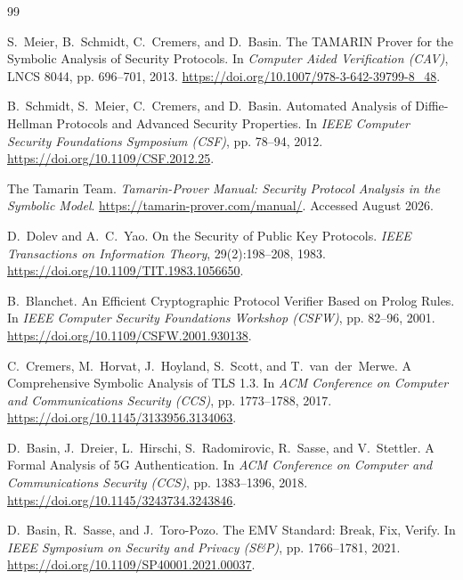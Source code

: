 \documentclass[version=preprint]{iacrcc}
\theoremstyle{definition}
\theoremstyle{remark}
\begin{document}
\begin{thebibliography}{99}

	S.~Meier, B.~Schmidt, C.~Cremers, and D.~Basin.
	\newblock The TAMARIN Prover for the Symbolic Analysis of Security Protocols.
	\newblock In \emph{Computer Aided Verification (CAV)}, LNCS 8044, pp. 696--701,
	2013.
	\newblock \url{https://doi.org/10.1007/978-3-642-39799-8_48}.

	B.~Schmidt, S.~Meier, C.~Cremers, and D.~Basin.
	\newblock Automated Analysis of Diffie-Hellman Protocols and Advanced Security
	Properties.
	\newblock In \emph{IEEE Computer Security Foundations Symposium (CSF)},
	pp. 78--94, 2012.
	\newblock \url{https://doi.org/10.1109/CSF.2012.25}.

	The Tamarin Team.
	\newblock \emph{Tamarin-Prover Manual: Security Protocol Analysis in the
		Symbolic Model}.
	\newblock \url{https://tamarin-prover.com/manual/}. Accessed August 2026.

	D.~Dolev and A.~C.~Yao.
	\newblock On the Security of Public Key Protocols.
	\newblock \emph{IEEE Transactions on Information Theory}, 29(2):198--208, 1983.
	\newblock \url{https://doi.org/10.1109/TIT.1983.1056650}.

	B.~Blanchet.
	\newblock An Efficient Cryptographic Protocol Verifier Based on Prolog Rules.
	\newblock In \emph{IEEE Computer Security Foundations Workshop (CSFW)},
	pp. 82--96, 2001.
	\newblock \url{https://doi.org/10.1109/CSFW.2001.930138}.

	C.~Cremers, M.~Horvat, J.~Hoyland, S.~Scott, and T.~van~der~Merwe.
	\newblock A Comprehensive Symbolic Analysis of TLS 1.3.
	\newblock In \emph{ACM Conference on Computer and Communications Security
		(CCS)}, pp. 1773--1788, 2017.
	\newblock \url{https://doi.org/10.1145/3133956.3134063}.

	D.~Basin, J.~Dreier, L.~Hirschi, S.~Radomirovic, R.~Sasse, and V.~Stettler.
	\newblock A Formal Analysis of 5G Authentication.
	\newblock In \emph{ACM Conference on Computer and Communications Security
		(CCS)}, pp. 1383--1396, 2018.
	\newblock \url{https://doi.org/10.1145/3243734.3243846}.

	D.~Basin, R.~Sasse, and J.~Toro-Pozo.
	\newblock The EMV Standard: Break, Fix, Verify.
	\newblock In \emph{IEEE Symposium on Security and Privacy (S\&P)},
	pp. 1766--1781, 2021.
	\newblock \url{https://doi.org/10.1109/SP40001.2021.00037}.


\end{thebibliography}
\end{document}
